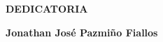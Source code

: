 \newpage
\vspace*{\fill}
\begin{flushright}
	\footnotesize
	\begin{minipage}{0.5\textwidth}
		\begin{flushright}
			\uppercase{\textbf{Dedicatoria}}
		\end{flushright}
		\itshape

		\bigbreak
		\begin{flushright}
			\textbf{Jonathan José Pazmiño Fiallos}
		\end{flushright}
	\end{minipage}
\end{flushright}
\vspace*{\fill}
